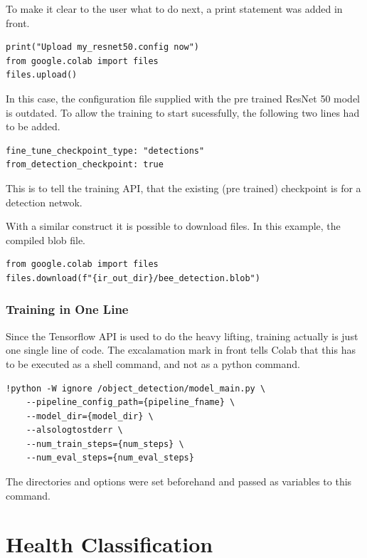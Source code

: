 \documentclass[a4paper,titlepage]{article}
\begin{document}
To make it clear to the user what to do next, a print statement was added in front.

\begin{lstlisting}
print("Upload my_resnet50.config now")
from google.colab import files
files.upload()
\end{lstlisting}

In this case, the configuration file supplied with the pre trained ResNet 50 model is outdated.
To allow the training to start sucessfully, the following two lines had to be added.

\begin{lstlisting}
fine_tune_checkpoint_type: "detections"
from_detection_checkpoint: true
\end{lstlisting}

This is to tell the training API, that the existing (pre trained) checkpoint is for a detection netwok.

With a similar construct it is possible to download files.
In this example, the compiled blob file.

\begin{lstlisting}
from google.colab import files
files.download(f"{ir_out_dir}/bee_detection.blob")
\end{lstlisting}

\subsubsection{Training in One Line}

Since the Tensorflow API is used to do the heavy lifting, training actually is just one single line of code.
The excalamation mark in front tells Colab that this has to be executed as a shell command, and not as a python command.

\begin{lstlisting}
!python -W ignore /object_detection/model_main.py \
    --pipeline_config_path={pipeline_fname} \
    --model_dir={model_dir} \
    --alsologtostderr \
    --num_train_steps={num_steps} \
    --num_eval_steps={num_eval_steps}
\end{lstlisting}

The directories and options were set beforehand and passed as variables to this command.

\newpage
\section{Health Classification}
\end{document}
